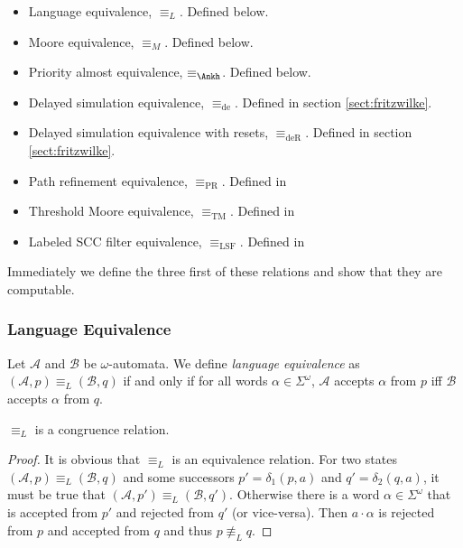 \begin{itemize}
	\item Language equivalence, $\equiv_L$. Defined below.
	\item Moore equivalence, $\equiv_M$. Defined below.
	\item Priority almost equivalence, $\equiv_\text{\Ankh}$. Defined below.
	\item Delayed simulation equivalence, $\equiv_\text{de}$. Defined in section \ref{sect:fritzwilke}.
	\item Delayed simulation equivalence with resets, $\equiv_\text{deR}$. Defined in section \ref{sect:fritzwilke}.
	\item Path refinement equivalence, $\equiv_\text{PR}$. Defined in %
	\item Threshold Moore equivalence, $\equiv_\text{TM}$. Defined in %
	\item Labeled SCC filter equivalence, $\equiv_\text{LSF}$. Defined in %
\end{itemize}

Immediately we define the three first of these relations and show that they are computable.

\vspace{5pt}

\subsubsection{Language Equivalence}

\begin{defn}
	Let $\mathcal{A}$ and $\mathcal{B}$ be $\omega$-automata. We define \emph{language equivalence} as $(\mathcal{A}, p) \equiv_L (\mathcal{B}, q)$ if and only if for all words $\alpha \in \Sigma^\omega$, $\mathcal{A}$ accepts $\alpha$ from $p$ iff $\mathcal{B}$ accepts $\alpha$ from $q$.
\end{defn}

\begin{lem}
	$\equiv_L$ is a congruence relation.
	\label{lem:general:L_congruence}
\end{lem}

\begin{proof}
	It is obvious that $\equiv_L$ is an equivalence relation. For two states $(\mathcal{A}, p) \equiv_L (\mathcal{B}, q)$ and some successors $p' = \delta_1(p, a)$ and $q' = \delta_2(q, a)$, it must be true that $(\mathcal{A}, p') \equiv_L (\mathcal{B}, q')$. Otherwise there is a word $\alpha \in \Sigma^\omega$ that is accepted from $p'$ and rejected from $q'$ (or vice-versa). Then $a \cdot \alpha$ is rejected from $p$ and accepted from $q$ and thus $p \not\equiv_L q$.
\end{proof}

